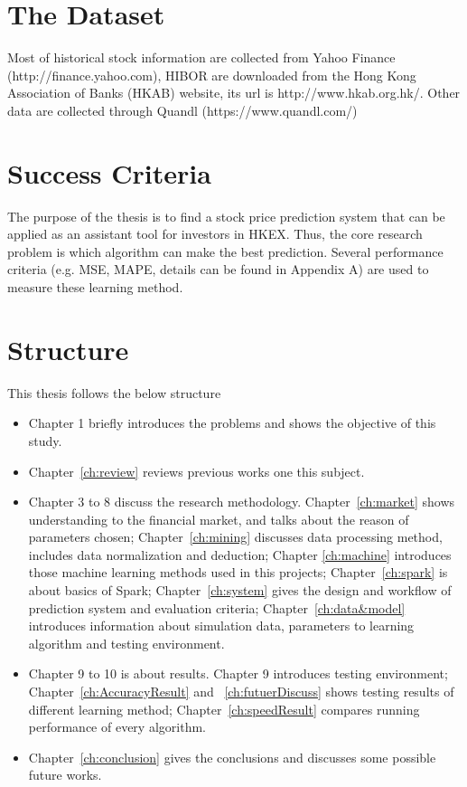 \section{The Dataset}
Most of historical stock information are collected from Yahoo Finance (http://finance.yahoo.com), HIBOR are downloaded from the Hong Kong Association of Banks (HKAB) website, its url is http://www.hkab.org.hk/. Other data are collected through Quandl (https://www.quandl.com/)

\section{Success Criteria}
The purpose of the thesis is to find a stock price prediction system that can be applied as an assistant tool for investors in HKEX. Thus, the core research problem is which algorithm can make the best prediction. Several performance criteria (e.g. MSE, MAPE, details can be found in Appendix A) are used to measure these learning method.


\section{Structure}


This thesis follows the below structure\par
\begin{itemize}
	\item Chapter 1 briefly introduces the problems and shows the objective of this study.
	\item Chapter~\ref{ch:review} reviews previous works one this subject.
	\item Chapter 3 to 8 discuss the research methodology. Chapter~\ref{ch:market} shows understanding to the financial market, and talks about the reason of parameters chosen; Chapter~\ref{ch:mining} discusses data processing method, includes data normalization and deduction; Chapter \ref{ch:machine} introduces those machine learning methods used in this projects; Chapter~\ref{ch:spark} is about basics of Spark; Chapter~\ref{ch:system} gives the design and workflow of prediction system and evaluation criteria; Chapter~\ref{ch:data&model} introduces information about simulation data, parameters to learning algorithm and testing environment.
	\item Chapter 9 to 10 is about results. Chapter 9 introduces testing environment; Chapter~\ref{ch:AccuracyResult} and ~\ref{ch:futuerDiscuss} shows testing results of different learning method; Chapter~\ref{ch:speedResult} compares running performance of every algorithm.
	\item Chapter~\ref{ch:conclusion} gives the conclusions and discusses some possible future works.
\end{itemize}

